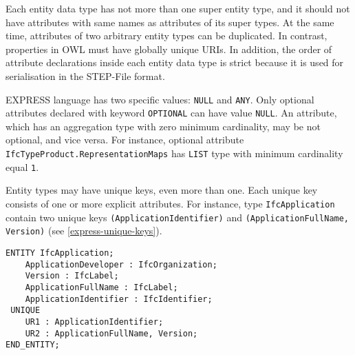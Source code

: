 Each entity data type has not more than one super entity type, and it should not have attributes with same names as attributes of its super types.
At the same time, attributes of two arbitrary entity types can be duplicated.
In contrast, properties in OWL must have globally unique URIs.
In addition, the order of attribute declarations inside each entity data type is strict because it is used for serialisation in the STEP-File format.



EXPRESS language has two specific values: \texttt{NULL} and \texttt{ANY}.
Only optional attributes declared with keyword \texttt{OPTIONAL} can have value \texttt{NULL}.
An attribute, which has an aggregation type with zero minimum cardinality, may be not optional, and vice versa.
For instance, optional attribute \texttt{IfcTypeProduct.RepresentationMaps} has \texttt{LIST} type with minimum cardinality equal \texttt{1}.


Entity types may have unique keys, even more than one.
Each unique key consists of one or more explicit attributes.
For instance, type \texttt{IfcApplication} contain two unique keys \texttt{(ApplicationIdentifier)} and \texttt{(ApplicationFullName, Version)} (see \autoref{express-unique-keys}).


\begin{lstlisting}[caption={},label=lst:express-unique-keys]
ENTITY IfcApplication;
	ApplicationDeveloper : IfcOrganization;
	Version : IfcLabel;
	ApplicationFullName : IfcLabel;
	ApplicationIdentifier : IfcIdentifier;
 UNIQUE
	UR1 : ApplicationIdentifier;
	UR2 : ApplicationFullName, Version;
END_ENTITY;
\end{lstlisting}


    
    
  
    
    
    
    
    
    



